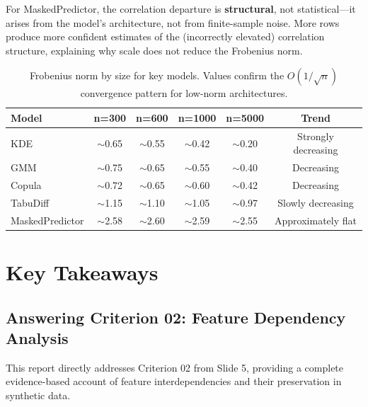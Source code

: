 \documentclass[11pt, a4paper]{report}
\begin{document}
For MaskedPredictor, the correlation departure is \textbf{structural}, not statistical---it arises from the model's architecture, not from finite-sample noise. More rows produce more confident estimates of the (incorrectly elevated) correlation structure, explaining why scale does not reduce the Frobenius norm.

\begin{table}[H]
\centering
\caption{Frobenius norm by size for key models. Values confirm the $O(1/\sqrt{n})$ convergence pattern for low-norm architectures.}
\label{tab:frob_by_size}
\begin{tabular}{lccccc}
\toprule
\textbf{Model} & \textbf{n=300} & \textbf{n=600} & \textbf{n=1000} & \textbf{n=5000} & \textbf{Trend} \\
\midrule
KDE             & $\sim$0.65 & $\sim$0.55 & $\sim$0.42 & $\sim$0.20 & Strongly decreasing \\
GMM             & $\sim$0.75 & $\sim$0.65 & $\sim$0.55 & $\sim$0.40 & Decreasing \\
Copula          & $\sim$0.72 & $\sim$0.65 & $\sim$0.60 & $\sim$0.42 & Decreasing \\
TabuDiff        & $\sim$1.15 & $\sim$1.10 & $\sim$1.05 & $\sim$0.97 & Slowly decreasing \\
MaskedPredictor & $\sim$2.58 & $\sim$2.60 & $\sim$2.59 & $\sim$2.55 & Approximately flat \\
\bottomrule
\end{tabular}
\end{table}


\chapter{Key Takeaways}

\section{Answering Criterion 02: Feature Dependency Analysis}

This report directly addresses Criterion 02 from Slide 5, providing a complete evidence-based account of feature interdependencies and their preservation in synthetic data.
\end{document}
